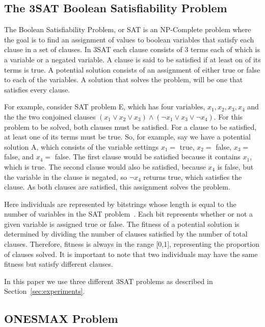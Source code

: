 \documentclass[12pt]{article}
\begin{document}
\subsection{The 3SAT Boolean Satisfiability Problem}
\label{sec:3sat}
The Boolean Satisfiability Problem, or SAT is an NP-Complete problem where the goal is to find an assignment of values to boolean variables that satisfy each clause in a set of clauses. In 3SAT each clause consists of 3 terms each of which is a variable or a negated variable. A clause is said to be satisfied if at least on of its terms is true. A potential solution consists of an assignment of either true or false to each of the variables. A solution that solves the problem, will be one that satisfies every clause. 

For example, consider SAT problem E, which has four variables, $x_{1}, x_{2}, x_{3}, x_{4}$ and the the two conjoined clauses $(x_{1} \vee x_{2} \vee x_{3}) \wedge (\neg x_{1} \vee x_{3} \vee \neg x_{4})$. For this problem to be solved, both clauses must be satisfied. For a clause to be satisfied, at least one of its terms must be true. So, for example, say we have a potential solution A, which consists of the variable settings $x_{1} =$ true, $x_{2} =$ false, $x_{3} =$ false, and $x_{4} =$ false. The first clause would be satisfied because it contains $x_{1}$, which is true. The second clause would also be satisfied, because $x_{4}$ is false, but the variable in the clause is negated, so $\neg x_{4}$ returns true, which satisfies the clause. As both clauses are satisfied, this assignment solves the problem.	

Here individuals are represented by bitstrings whose length is equal to the number of variables in the SAT problem~\cite{Gottlieb:2002:EAS:638548.638550}. Each bit represents whether or not a given variable is assigned true or false. The fitness of a potential solution is determined by dividing the number of clauses satisfied by the number of total clauses. Therefore, fitness is always in the range [0,1], representing the proportion of clauses solved. It is important to note that two individuals may have the same fitness but satisfy different clauses.

In this paper we use three different 3SAT problems as described in Section~\ref{sec:experiments}.


\subsection{ONESMAX Problem}
\label{sec:ONESMAX}
\end{document}

